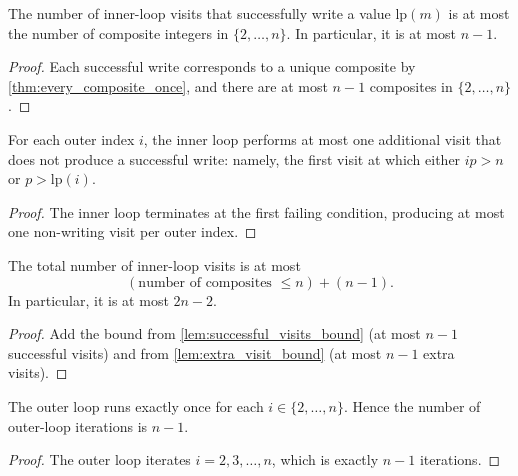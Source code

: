 \begin{lemma}
    \label{lem:successful_visits_bound}
    The number of inner-loop visits that successfully write a value $\mathrm{lp}(m)$ is at most the number of composite integers in $\{2,\dots,n\}$.
    In particular, it is at most $n-1$.
\end{lemma}
\begin{proof}
    Each successful write corresponds to a unique composite by \ref{thm:every_composite_once}, and there are at most $n-1$ composites in $\{2,\dots,n\}$.
\end{proof}

\begin{lemma}
    \label{lem:extra_visit_bound}
    For each outer index $i$, the inner loop performs at most one additional visit that does not produce a successful write:
    namely, the first visit at which either $ip>n$ or $p>\mathrm{lp}(i)$.
\end{lemma}
\begin{proof}
    The inner loop terminates at the first failing condition, producing at most one non-writing visit per outer index.
\end{proof}

\begin{lemma}
    \label{lem:all_inner_visits_bound}
    The total number of inner-loop visits is at most
    \[
        (\text{number of composites }\le n) + (n-1).
    \]
    In particular, it is at most $2n-2$.
\end{lemma}
\begin{proof}
    Add the bound from \ref{lem:successful_visits_bound} (at most $n-1$ successful visits) and from \ref{lem:extra_visit_bound} (at most $n-1$ extra visits).
\end{proof}

\begin{lemma}
    \label{lem:outer_iterations_bound}
    The outer loop runs exactly once for each $i\in\{2,\dots,n\}$.
    Hence the number of outer-loop iterations is $n-1$.
\end{lemma}
\begin{proof}
    The outer loop iterates $i = 2, 3, \dots, n$, which is exactly $n-1$ iterations.
\end{proof}


